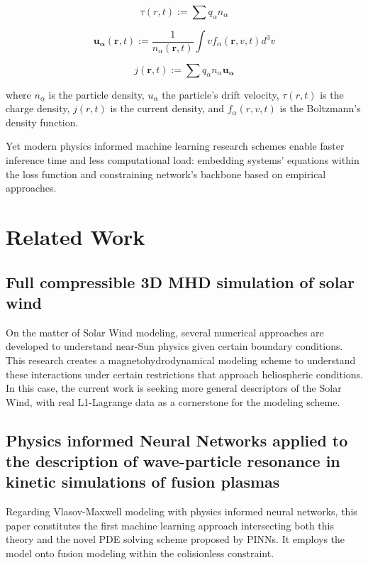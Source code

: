 \documentclass[12pt]{article}
\begin{document}
\begin{equation}
    \tau(r, t) := \sum q_{\alpha} n_{\alpha}
\end{equation}

\begin{equation}
    \mathbf{u_{\alpha}} (\mathbf{r}, t) := \frac{1}{n_{\alpha}(\mathbf{r}, t)} \int v f_{\alpha}(\mathbf{r}, v, t) d^3v
\end{equation}

\begin{equation}
    j(\mathbf{r}, t) := \sum q_{\alpha} n_{\alpha} \mathbf{u_{\alpha}}
\end{equation}

where $n_{\alpha}$ is the particle density, $u_{\alpha}$ the particle's drift velocity, $\tau(r, t)$ is the charge density, $j(r, t)$ is the current density, and $f_{\alpha}(r, v, t)$ is the Boltzmann's density function.

Yet modern physics informed machine learning research schemes enable faster inference time and less computational load: embedding systems' equations within the loss function and constraining network's backbone based on empirical approaches.

\section{Related Work}

\subsection{Full compressible 3D MHD simulation of solar wind}
On the matter of Solar Wind modeling, several numerical approaches are developed to understand near-Sun physics given certain boundary conditions. This research \cite{windmodelling1} creates a magnetohydrodynamical modeling scheme to understand these interactions under certain restrictions that approach heliospheric conditions. In this case, the current work is seeking more general descriptors of the Solar Wind, with real L1-Lagrange data as a cornerstone for the modeling scheme.

\subsection{Physics informed Neural Networks applied to the description of wave-particle resonance in kinetic simulations of fusion plasmas}

Regarding Vlasov-Maxwell modeling with physics informed neural networks, this paper constitutes the first machine learning approach intersecting both this theory and the novel PDE solving scheme proposed by PINNs. \cite{kumar2023physicsinformedneuralnetworks} It employs the model onto fusion modeling within the colisionless constraint.
\end{document}
